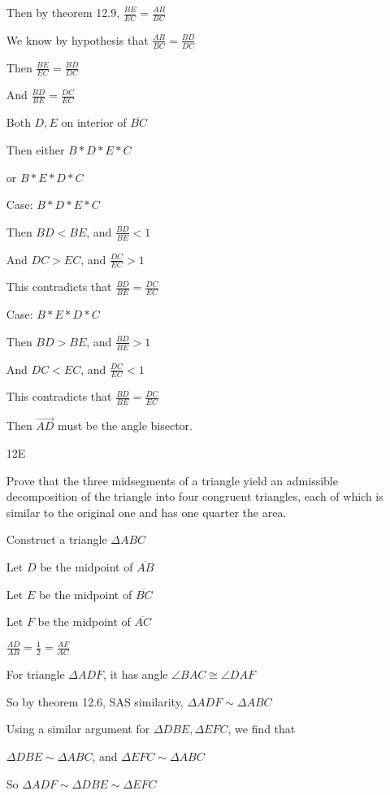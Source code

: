 \documentclass[11pt]{article}
\newcommand{\ray}[1]{\overrightarrow{#1}}
\newcommand{\segment}[1]{\overline{#1}}
\begin{document}
\begin{itemize}
		Then by theorem 12.9, $\frac{BE}{EC} = \frac{AB}{BC}$

		We know by hypothesis that $\frac{AB}{BC} = \frac{BD}{DC}$

		Then $\frac{BE}{EC} = \frac{BD}{DC}$

		And $\frac{BD}{BE} = \frac{DC}{EC}$

		Both $D,E$ on interior of $\segment{BC}$

		Then either $B * D * E* C$

		or $B * E * D * C$

		Case: $B * D * E * C$

		Then $BD < BE$, and $\frac{BD}{BE} < 1$

		And $DC > EC$, and $\frac{DC}{EC} > 1$

		This contradicts that $\frac{BD}{BE} = \frac{DC}{EC}$

		Case: $B * E * D * C$

		Then $BD > BE$, and $\frac{BD}{BE} > 1$

		And $DC < EC$, and $\frac{DC}{EC} < 1$

		This contradicts that $\frac{BD}{BE} = \frac{DC}{EC}$

		Then $\ray{AD}$ must be the angle bisector.

	\item[12E]

		Prove that the three midsegments of a triangle yield an admissible decomposition of the triangle into four congruent triangles, each of which is similar to the original one and has one quarter the area.

		Construct a triangle $\Delta ABC$

		Let $D$ be the midpoint of $\segment{AB}$

		Let $E$ be the midpoint of $\segment{BC}$

		Let $F$ be the midpoint of $\segment{AC}$

		$\frac{AD}{AB} = \frac{1}{2} = \frac{AF}{AC}$

		For triangle $\Delta ADF$, it has angle $\angle BAC \cong \angle DAF$

		So by theorem 12.6, SAS similarity, $\Delta ADF \sim \Delta ABC$

		Using a similar argument for $\Delta DBE, \Delta EFC$, we find that

		$\Delta DBE \sim \Delta ABC$, and $\Delta EFC \sim \Delta ABC$

		So $\Delta ADF \sim \Delta DBE \sim \Delta EFC$


\end{itemize}
\end{document}

